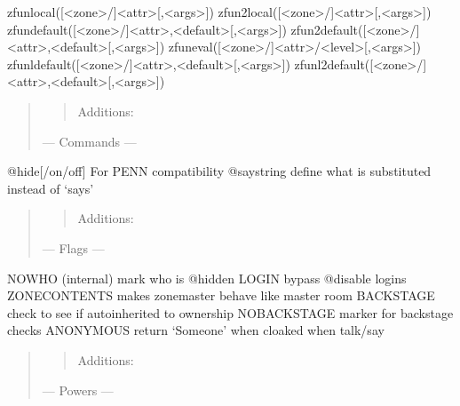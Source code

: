 \documentclass[letterpaper,10pt,english]{sphinxmanual}
\begin{document}
zfunlocal({[}\textless{}zone\textgreater{}/{]}\textless{}attr\textgreater{}{[},\textless{}args\textgreater{}{]})
zfun2local({[}\textless{}zone\textgreater{}/{]}\textless{}attr\textgreater{}{[},\textless{}args\textgreater{}{]})
zfundefault({[}\textless{}zone\textgreater{}/{]}\textless{}attr\textgreater{},\textless{}default\textgreater{}{[},\textless{}args\textgreater{}{]})
zfun2default({[}\textless{}zone\textgreater{}/{]}\textless{}attr\textgreater{},\textless{}default\textgreater{}{[},\textless{}args\textgreater{}{]})
zfuneval({[}\textless{}zone\textgreater{}/{]}\textless{}attr\textgreater{}/\textless{}level\textgreater{}{[},\textless{}args\textgreater{}{]})
zfunldefault({[}\textless{}zone\textgreater{}/{]}\textless{}attr\textgreater{},\textless{}default\textgreater{}{[},\textless{}args\textgreater{}{]})
zfunl2default({[}\textless{}zone\textgreater{}/{]}\textless{}attr\textgreater{},\textless{}default\textgreater{}{[},\textless{}args\textgreater{}{]})
\begin{quote}
\begin{quote}

\sphinxAtStartPar
Additions:
\end{quote}

\sphinxAtStartPar
— Commands —
\end{quote}

\sphinxAtStartPar
@hide{[}/on/off{]} \sphinxhyphen{} For PENN compatibility
@saystring \sphinxhyphen{} define what is substituted instead of ‘says’
\begin{quote}
\begin{quote}

\sphinxAtStartPar
Additions:
\end{quote}

\sphinxAtStartPar
— Flags —
\end{quote}

\sphinxAtStartPar
NOWHO (internal) \sphinxhyphen{} mark who is @hidden
LOGIN \sphinxhyphen{} bypass @disable logins
ZONECONTENTS \sphinxhyphen{} makes zonemaster behave like master room
BACKSTAGE \sphinxhyphen{} check to see if auto\sphinxhyphen{}inherited to ownership
NOBACKSTAGE \sphinxhyphen{} marker for backstage checks
ANONYMOUS \sphinxhyphen{} return ‘Someone’ when cloaked when talk/say
\begin{quote}
\begin{quote}

\sphinxAtStartPar
Additions:
\end{quote}

\sphinxAtStartPar
— Powers —
\end{quote}
\end{document}
